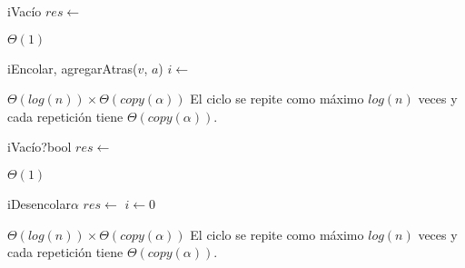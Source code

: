 \begin{Algoritmos}


  \begin{algoritmo}{iVac\'io}{}{}
    $res \gets$ \vacia{} 
  \end{algoritmo}
  \datosAlgoritmo{} %
  {} %
  {} %
  {$\Theta(1)$} %
  {} %

  \begin{algoritmo}{iEncolar}{, }{}
    agregarAtras($v$, $a$) 
     $i \gets$  
  \end{algoritmo}
  \datosAlgoritmo{} %
  {} %
  {} %
  {$\Theta(log(n)) \times \Theta(copy(\alpha))$} %
  {El ciclo se repite como m\'aximo $log(n)$ veces y cada repetici\'on tiene $\Theta(copy(\alpha))$. } %

  \begin{algoritmo}{iVac\'{i}o?}{}{bool}
    $res \gets$  
  \end{algoritmo}
  \datosAlgoritmo{} %
  {} %
  {} %
  {$\Theta(1)$} %
  {} %

  \begin{algoritmo}{iDesencolar}{}{$\alpha$}
    $res \gets$  
     $i \gets 0$ 
  \end{algoritmo}
  \datosAlgoritmo{} %
  {} %
  {} %
  {$\Theta(log(n)) \times \Theta(copy(\alpha))$} %
  {El ciclo se repite como m\'aximo $log(n)$ veces y cada repetici\'on tiene $\Theta(copy(\alpha))$. } %


\end{Algoritmos}
